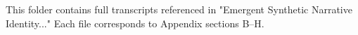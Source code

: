 This folder contains full transcripts referenced in
"Emergent Synthetic Narrative Identity..."
Each file corresponds to Appendix sections B–H.
